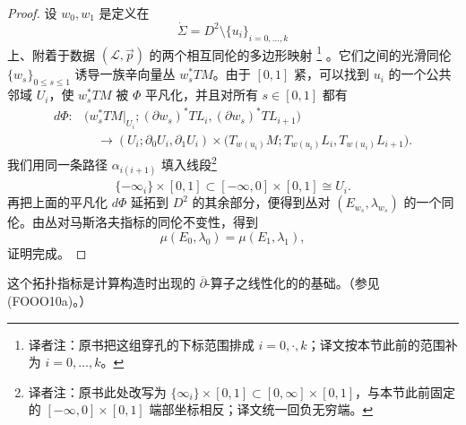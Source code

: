 \begin{proof}
设 $w_0,w_1$ 是定义在
\[
  \dot\Sigma=D^2\setminus\{u_i\}_{i=0,\ldots,k}
\]
上、附着于数据 $(\mathcal L,\vec p)$ 的两个相互同伦的多边形映射
\footnote{译者注：原书把这组穿孔的下标范围排成
$i=0,\mathord\cdot,k$；译文按本节此前的范围补为 $i=0,\ldots,k$。}
。它们之间的光滑同伦 $\{w_s\}_{0\le s\le1}$ 诱导一族辛向量丛
$w_s^*TM$。由于 $[0,1]$ 紧，可以找到 $u_i$ 的一个公共邻域 $U_i$，使
$w_s^*TM$ 被 $\Phi$ 平凡化，并且对所有 $s\in[0,1]$ 都有
\[
\begin{aligned}
  d\Phi:
  &\bigl(w_s^*TM|_{U_i};
    (\partial w_s)^*TL_i,(\partial w_s)^*TL_{i+1}\bigr)\\
  &\quad\longrightarrow
  (U_i;\partial_0U_i,\partial_1U_i)
  \times
  \bigl(T_{w(u_i)}M;T_{w(u_i)}L_i,T_{w(u_i)}L_{i+1}\bigr).
\end{aligned}
\]
我们用同一条路径 $\alpha_{i(i+1)}$ 填入线段\footnote{译者注：原书此处改写为
$\{\infty_i\}\times[0,1]\subset[0,\infty]\times[0,1]$，与本节此前固定的
$[-\infty,0]\times[0,1]$ 端部坐标相反；译文统一回负无穷端。}
\[
  \{-\infty_i\}\times[0,1]
  \subset[-\infty,0]\times[0,1]
  \cong\widehat U_i.
\]
再把上面的平凡化 $d\Phi$ 延拓到 $D^2$ 的其余部分，便得到丛对
$(E_{w_s},\lambda_{w_s})$ 的一个同伦。由丛对马斯洛夫指标的同伦不变性，得到
\[
  \mu(E_0,\lambda_0)=\mu(E_1,\lambda_1),
\]
证明完成。
\end{proof}

这个拓扑指标是计算构造\termFukayaCategory{}时出现的
$\overline\partial$-算子之线性化的\termFredholmIndex{}的基础。（参见
(FOOO10a)。）
